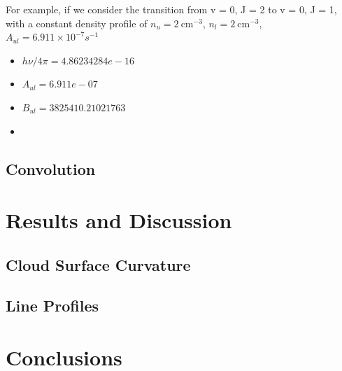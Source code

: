 \documentclass[12pt,a4paper]{article}
\begin{document}
For example, if we consider the  transition from v = 0, J = 2 to v = 0, J = 1, with a constant density profile of $n_u = \qty{2}{\cm^{-3}}$, $n_l = \qty{2}{\cm^{-3}}$, $A_{ul} = 6.911 \times 10^{-7} s^{-1}$
\begin{itemize}
    \item $h\nu/4\pi = 4.86234284e-16 $
    \item $A_{ul} = 6.911e-07$
    \item $B_{ul} = 3825410.21021763$
    \item 
\end{itemize}

\subsection{Convolution}

\section{Results and Discussion}
\subsection{Cloud Surface Curvature}
\subsection{Line Profiles}

\section{Conclusions}

\newpage
\printbibliography

\newpage
\appendix
\end{document}
